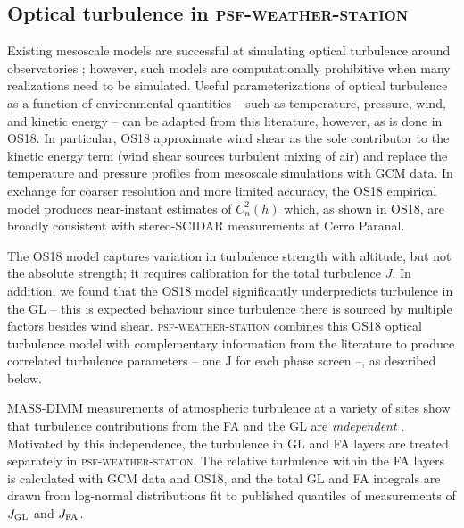 \documentclass[twocolumn]{aastex631}
\newcommand{\psfws}{\textsc{psf-weather-station}\xspace}
\newcommand{\osborn}{OS18\xspace}
\begin{document}
\subsection{Optical turbulence in \psfws}\label{sec:psfwsturb}
Existing mesoscale models are successful at simulating optical turbulence around observatories \citep{masciadri_improvements_2001, masciadri_optical_2017}; however, such models are computationally prohibitive when many realizations need to be simulated. 
Useful parameterizations of optical turbulence as a function of environmental quantities -- such as temperature, pressure, wind, and kinetic energy -- can be adapted from this literature, however, as is done in \osborn.
In particular, \osborn approximate wind shear as the sole contributor to the kinetic energy term (\ie wind shear sources turbulent mixing of air) and replace the temperature and pressure profiles from mesoscale simulations with GCM data.
In exchange for coarser resolution and more limited accuracy, the \osborn empirical model produces near-instant estimates of $C_n^2(h)$ which, as shown in \osborn, are broadly consistent with stereo-SCIDAR measurements at Cerro Paranal. 

The \osborn model captures variation in turbulence strength with altitude, but not the absolute strength; it requires calibration for the total turbulence $J$.
In addition, we found that the \osborn model significantly underpredicts turbulence in the GL -- this is expected behaviour since turbulence there is sourced by multiple factors besides wind shear.
\psfws combines this \osborn optical turbulence model with complementary information from the literature to produce correlated turbulence parameters -- one J for each phase screen --, as described below.

MASS-DIMM measurements of atmospheric turbulence at a variety of sites show that turbulence contributions from the FA and the GL are \textit{independent} \citep{tokovinin_model_2005, tokovinin_optical_2005, chun_mauna_2009}.
Motivated by this independence, the turbulence in GL and FA layers are treated separately in \psfws.
The relative turbulence within the FA layers is calculated with GCM data and \osborn, and the total GL and FA integrals are drawn from log-normal distributions fit to published quantiles of measurements of $J_{\rm GL}$ and $J_{\rm FA}$.
\end{document}
